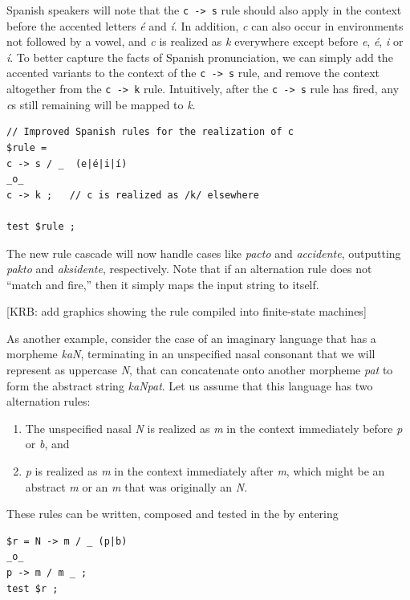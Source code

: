 Spanish speakers will note that the \texttt{c -> s} rule should also apply in the context
before the accented letters
\emph{é} and \emph{í}.  In addition, \emph{c} can also occur in environments not followed by a vowel,
and \emph{c} is realized as \emph{k} everywhere except before \emph{e}, \emph{é}, \emph{i} or \emph{í}.
To better capture the facts of Spanish pronunciation, 
we can simply add the accented variants to the context of the \texttt{c -> s}
rule, and remove the context altogether from the \texttt{c -> k} rule.  Intuitively, after the \texttt{c -> s}
rule has fired, any \emph{c}s still remaining will be mapped to \emph{k}.

\begin{Verbatim}
// Improved Spanish rules for the realization of c
$rule = 
c -> s / _  (e|é|i|í)
_o_
c -> k ;   // c is realized as /k/ elsewhere

test $rule ;
\end{Verbatim}

\noindent
The new rule cascade will now handle cases like \emph{pacto} and \emph{accidente},
outputting \emph{pakto} and \emph{aksidente}, respectively.  Note that if an
alternation rule does not ``match and fire,'' then it simply maps the input string to itself.  

[KRB:  add graphics showing the rule compiled into finite-state
machines]

As another example, consider the case of an imaginary language that has a
morpheme \emph{kaN}, terminating in an unspecified nasal consonant that we will
represent as uppercase \emph{N}, that can concatenate onto another morpheme
\emph{pat} to form the abstract string \emph{kaNpat}.  Let us assume that this language
has two alternation rules:

\begin{enumerate}
\item
The unspecified nasal \emph{N} is realized as \emph{m} in the context immediately before \emph{p} or
\emph{b}, and
\item
\emph{p} is realized as \emph{m} in the context immediately after \emph{m}, which might be an abstract
\emph{m} or an \emph{m} that was originally an \emph{N}.
\end{enumerate}

\noindent
These rules can be written, composed and tested in the  by entering


\begin{Verbatim}
$r = N -> m / _ (p|b)
_o_
p -> m / m _ ;
test $r ;
\end{Verbatim}

